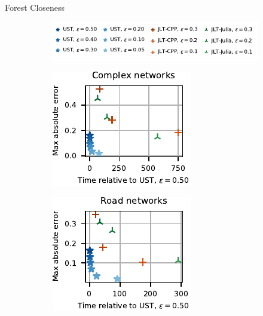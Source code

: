 \documentclass[10pt,titlepage,english,presentation]{beamer}
\begin{document}
\begin{frame}[t]{Forest Closeness}
\centering
\begin{figure}
\begin{subfigure}[t]{\textwidth}
\centering
\includegraphics[width=.4\textwidth]{../sources/plots/el-clos/forest-quality-legend.pdf}
\end{subfigure}

\begin{subfigure}[t]{.5\textwidth}
\centering
\includegraphics[width=.6\textwidth]{../sources/plots/el-clos/forest-max-abs-err-cplx.pdf}
\end{subfigure}\hfill
\begin{subfigure}[t]{.5\textwidth}
\centering
\includegraphics[width=.6\textwidth]{../sources/plots/el-clos/forest-max-abs-err-road.pdf}
\end{subfigure}\smallskip


\end{figure}
\end{frame}
\end{document}
